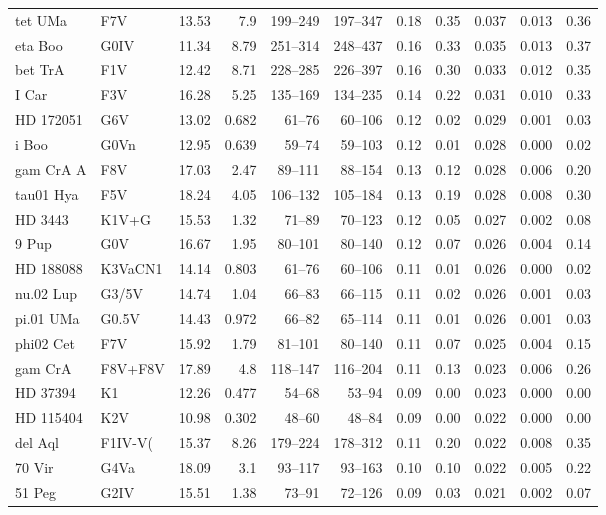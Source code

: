 \documentclass[11pt,a4paper]{article}
\begin{document}
{\begin{longtable}{llrrrrrrrrr}
tet UMa & F7V & 13.53 & 7.9 & 199--249 & 197--347 & 0.18 & 0.35 & 0.037 & 0.013 & 0.36 \\
eta Boo & G0IV & 11.34 & 8.79 & 251--314 & 248--437 & 0.16 & 0.33 & 0.035 & 0.013 & 0.37 \\
bet TrA & F1V & 12.42 & 8.71 & 228--285 & 226--397 & 0.16 & 0.30 & 0.033 & 0.012 & 0.35 \\
I Car & F3V & 16.28 & 5.25 & 135--169 & 134--235 & 0.14 & 0.22 & 0.031 & 0.010 & 0.33 \\
HD 172051 & G6V & 13.02 & 0.682 & 61--76 & 60--106 & 0.12 & 0.02 & 0.029 & 0.001 & 0.03 \\
i Boo & G0Vn & 12.95 & 0.639 & 59--74 & 59--103 & 0.12 & 0.01 & 0.028 & 0.000 & 0.02 \\
gam CrA A & F8V & 17.03 & 2.47 & 89--111 & 88--154 & 0.13 & 0.12 & 0.028 & 0.006 & 0.20 \\
tau01 Hya & F5V & 18.24 & 4.05 & 106--132 & 105--184 & 0.13 & 0.19 & 0.028 & 0.008 & 0.30 \\
HD   3443 & K1V+G & 15.53 & 1.32 & 71--89 & 70--123 & 0.12 & 0.05 & 0.027 & 0.002 & 0.08 \\
9 Pup & G0V & 16.67 & 1.95 & 80--101 & 80--140 & 0.12 & 0.07 & 0.026 & 0.004 & 0.14 \\
HD 188088 & K3VaCN1 & 14.14 & 0.803 & 61--76 & 60--106 & 0.11 & 0.01 & 0.026 & 0.000 & 0.02 \\
nu.02 Lup & G3/5V & 14.74 & 1.04 & 66--83 & 66--115 & 0.11 & 0.02 & 0.026 & 0.001 & 0.03 \\
pi.01 UMa & G0.5V & 14.43 & 0.972 & 66--82 & 65--114 & 0.11 & 0.01 & 0.026 & 0.001 & 0.03 \\
phi02 Cet & F7V & 15.92 & 1.79 & 81--101 & 80--140 & 0.11 & 0.07 & 0.025 & 0.004 & 0.15 \\
gam CrA & F8V+F8V & 17.89 & 4.8 & 118--147 & 116--204 & 0.11 & 0.13 & 0.023 & 0.006 & 0.26 \\
HD  37394 & K1 & 12.26 & 0.477 & 54--68 & 53--94 & 0.09 & 0.00 & 0.023 & 0.000 & 0.00 \\
HD 115404 & K2V & 10.98 & 0.302 & 48--60 & 48--84 & 0.09 & 0.00 & 0.022 & 0.000 & 0.00 \\
del Aql & F1IV-V( & 15.37 & 8.26 & 179--224 & 178--312 & 0.11 & 0.20 & 0.022 & 0.008 & 0.35 \\
70 Vir & G4Va & 18.09 & 3.1 & 93--117 & 93--163 & 0.10 & 0.10 & 0.022 & 0.005 & 0.22 \\
51 Peg & G2IV & 15.51 & 1.38 & 73--91 & 72--126 & 0.09 & 0.03 & 0.021 & 0.002 & 0.07 \\

\end{longtable}}
\end{document}
